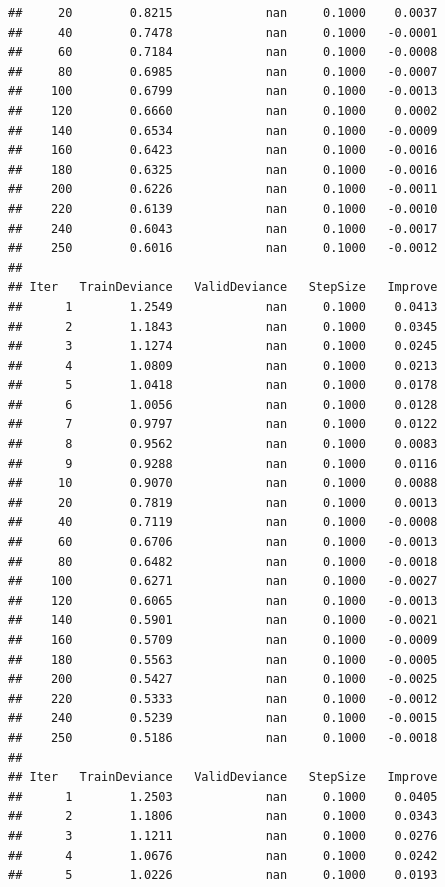 \documentclass[
]{book}
\begin{document}
\begin{verbatim}
##     20        0.8215             nan     0.1000    0.0037
##     40        0.7478             nan     0.1000   -0.0001
##     60        0.7184             nan     0.1000   -0.0008
##     80        0.6985             nan     0.1000   -0.0007
##    100        0.6799             nan     0.1000   -0.0013
##    120        0.6660             nan     0.1000    0.0002
##    140        0.6534             nan     0.1000   -0.0009
##    160        0.6423             nan     0.1000   -0.0016
##    180        0.6325             nan     0.1000   -0.0016
##    200        0.6226             nan     0.1000   -0.0011
##    220        0.6139             nan     0.1000   -0.0010
##    240        0.6043             nan     0.1000   -0.0017
##    250        0.6016             nan     0.1000   -0.0012
## 
## Iter   TrainDeviance   ValidDeviance   StepSize   Improve
##      1        1.2549             nan     0.1000    0.0413
##      2        1.1843             nan     0.1000    0.0345
##      3        1.1274             nan     0.1000    0.0245
##      4        1.0809             nan     0.1000    0.0213
##      5        1.0418             nan     0.1000    0.0178
##      6        1.0056             nan     0.1000    0.0128
##      7        0.9797             nan     0.1000    0.0122
##      8        0.9562             nan     0.1000    0.0083
##      9        0.9288             nan     0.1000    0.0116
##     10        0.9070             nan     0.1000    0.0088
##     20        0.7819             nan     0.1000    0.0013
##     40        0.7119             nan     0.1000   -0.0008
##     60        0.6706             nan     0.1000   -0.0013
##     80        0.6482             nan     0.1000   -0.0018
##    100        0.6271             nan     0.1000   -0.0027
##    120        0.6065             nan     0.1000   -0.0013
##    140        0.5901             nan     0.1000   -0.0021
##    160        0.5709             nan     0.1000   -0.0009
##    180        0.5563             nan     0.1000   -0.0005
##    200        0.5427             nan     0.1000   -0.0025
##    220        0.5333             nan     0.1000   -0.0012
##    240        0.5239             nan     0.1000   -0.0015
##    250        0.5186             nan     0.1000   -0.0018
## 
## Iter   TrainDeviance   ValidDeviance   StepSize   Improve
##      1        1.2503             nan     0.1000    0.0405
##      2        1.1806             nan     0.1000    0.0343
##      3        1.1211             nan     0.1000    0.0276
##      4        1.0676             nan     0.1000    0.0242
##      5        1.0226             nan     0.1000    0.0193

\end{verbatim}
\end{document}
